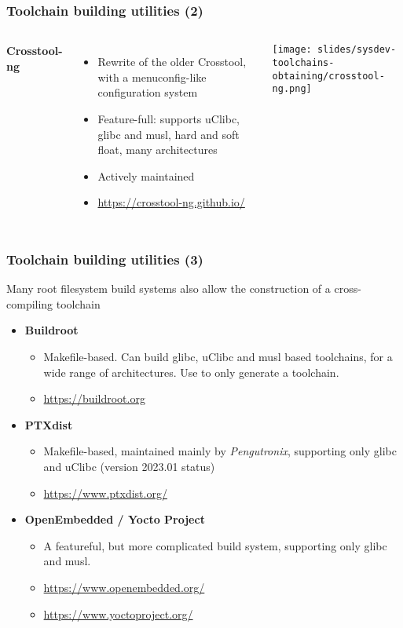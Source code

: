 \begin{frame}
  \frametitle{Toolchain building utilities (2)}
  \begin{columns}[T]
    {\bf Crosstool-ng}
    \begin{itemize}
      \item Rewrite of the older Crosstool, with a menuconfig-like configuration
	system
      \item Feature-full: supports uClibc, glibc and musl,
            hard and soft float, many architectures
      \item Actively maintained
      \item \url{https://crosstool-ng.github.io/}
    \end{itemize}
    \texttt{[image: slides/sysdev-toolchains-obtaining/crosstool-ng.png]}
  \end{columns}
\end{frame}

\begin{frame}
\frametitle{Toolchain building utilities (3)}
Many root filesystem build systems also allow the construction of
a cross-compiling toolchain
\begin{itemize}
\item {\bf Buildroot}
  \begin{itemize}
  \item Makefile-based. Can build glibc, uClibc and musl based
    toolchains, for a wide range of architectures. Use 
    to only generate a toolchain.
  \item \url{https://buildroot.org}
  \end{itemize}
\item {\bf PTXdist}
  \begin{itemize}
  \item Makefile-based, maintained mainly by {\em Pengutronix},
        supporting only glibc and uClibc (version 2023.01 status)
  \item \url{https://www.ptxdist.org/}
  \end{itemize}
\item {\bf OpenEmbedded / Yocto Project}
  \begin{itemize}
  \item A featureful, but more complicated build system, supporting only
        glibc and musl.
  \item \url{https://www.openembedded.org/}
  \item \url{https://www.yoctoproject.org/}
  \end{itemize}
\end{itemize}
\end{frame}


